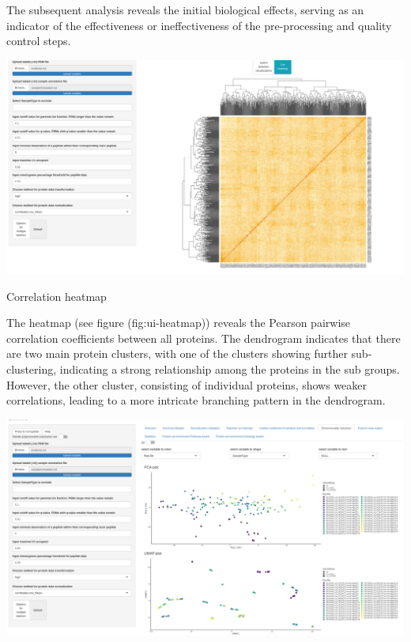 \documentclass[
  11pt,
]{article}
\let\origfigure\figure
\begin{document}
The subsequent analysis reveals the initial biological effects, serving as an indicator of the effectiveness or ineffectiveness of the pre-processing and quality control steps.

\bgroup  \origfigure[H] 

{\centering \includegraphics[width=1\linewidth]{screenshots/heatmap} 

}

\caption{Correlation heatmap}\label{fig:ui-heatmap}
 \endfigure\egroup

The heatmap (see figure (fig:ui-heatmap)) reveals the Pearson pairwise correlation coefficients between all proteins. The dendrogram indicates that there are two main protein clusters, with one of the clusters showing further sub-clustering, indicating a strong relationship among the proteins in the sub groups. However, the other cluster, consisting of individual proteins, shows weaker correlations, leading to a more intricate branching pattern in the dendrogram.

\newpage
\bgroup  \origfigure[H] 

{\centering \includegraphics[width=1\linewidth]{screenshots/dim_red_default} 

}
\end{document}
